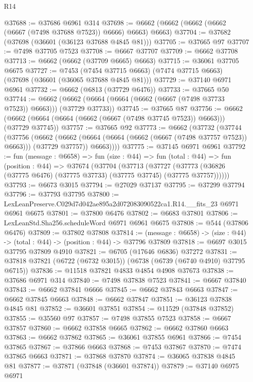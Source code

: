 \begin{lexlean}{R14}
\begin{coremodule}
@37688 := @37686 @6961 @314
@37698 := @6662 (@6662 (@6662 (@6662 (@6667 (@7498 @37688 @7523)) @6666) @6663) @6663)
@37704 := @37682 (@37698 (@36601 (@36123 @37688 @4845 @81)))
@37705 := @37665 @97
@37707 := @7498 @37705 @7523
@37708 := @6667 @37707
@37709 := @6662 @37708
@37713 := @6662 (@6662 (@37709 @6665) @6663)
@37715 := @36061 @37705 @6675
@37727 := @7453
    (@7454 @37715 @6663)
    (@7474 @37715 @6663)
    (@37698 (@36601 (@36065 @37688 @4845 @81)))
@37729 := @37140 @6971 @6961
@37732 := @6662 (@6813 (@37729 @6476))
@37733 := @37665 @50
@37744 := @6662 (@6662 (@6664 (@6664 (@6662 (@6667 (@7498 @37733 @7523)) @6663))) (@37729 @37733))
@37745 := @37665 @87
@37756 := @6662 (@6662 (@6664 (@6664 (@6662 (@6667 (@7498 @37745 @7523)) @6663))) (@37729 @37745))
@37757 := @37665 @92
@37773 := @6662
    (@37732
      (@37744
        (@37756
          (@6662
            (@6662 (@6664 (@6664 (@6662 (@6667 (@7498 @37757 @7523)) @6663))) (@37729 @37757))
            @6663))))
@37775 := @37145 @6971 @6961
@37792 := fun (message : @6658) =>
  fun (size : @44) =>
  fun (total : @44) =>
  fun (position : @44) =>
  @37674
    (@37704
      (@37713
        (@37727 (@37773 (@36826 (@37775 @6476) (@37775 @37733) (@37775 @37745) (@37775 @37757))))))
@37793 := @6673 @3015
@37794 := @27029 @37137
@37795 := @37299 @37794
@37796 := @37793 @37795
@37800 := LexLeanPreserve.C029d7d042ae895a2d072083090522ca1.R14.__fits_23 @6971 @6961 @6675
@37801 := @37800 @6476
@37802 := @6683 @37801
@37806 := LexLeanStd.Sha256.scheduleWord @6971 @6961 @6675
@37808 := @544 (@37806 @6476)
@37809 := @37802 @37808
@37814 := (message : @6658) -> (size : @44) -> (total : @44) -> (position : @44) -> @37796 @37809
@37818 := @6697 @3015 @37795 @37809 @4910
@37821 := @6705 (@17646 @6836) @37272
@37831 := @37818 @37821 (@6722 (@6732 @3015)) (@6738 (@6739 (@6740 @4910) @37795 @6715))
@37836 := @11518 @37821 @4833 @4854 @4908 @37673
@37838 := @37686 @6971 @314
@37840 := @7498 @37838 @7523
@37841 := @6667 @37840
@37843 := @6662 @37841 @6666
@37845 := @6662 @37843 @6663
@37847 := @6662 @37845 @6663
@37848 := @6662 @37847
@37851 := @36123 @37838 @4845 @81
@37852 := @36601 @37851
@37854 := @11529 (@37848 @37852)
@37855 := @35560 @97
@37857 := @7498 @37855 @7523
@37858 := @6667 @37857
@37860 := @6662 @37858 @6665
@37862 := @6662 @37860 @6663
@37863 := @6662 @37862
@37865 := @36061 @37855 @6961
@37866 := @7454 @37865
@37867 := @37866 @6663
@37868 := @7453 @37867
@37870 := @7474 @37865 @6663
@37871 := @37868 @37870
@37874 := @36065 @37838 @4845 @81
@37877 := @37871 (@37848 (@36601 @37874))
@37879 := @37140 @6975 @6971

\end{coremodule}
\end{lexlean}
